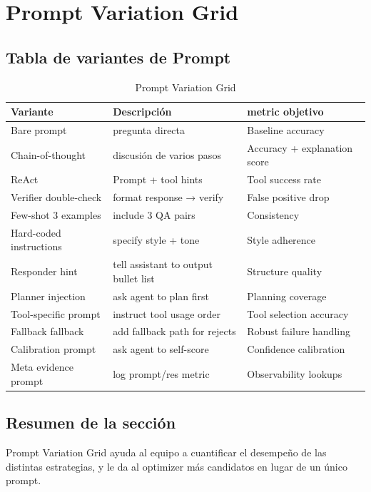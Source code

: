 \section{Prompt Variation Grid}

\subsection{Tabla de variantes de Prompt}

\begin{table}[H]
\centering
\caption{Prompt Variation Grid}
\begin{tabular}{p{}p{}p{}}
\toprule
Variante & Descripción & metric objetivo \\
\midrule
Bare prompt & pregunta directa & Baseline accuracy \\
Chain-of-thought & discusión de varios pasos & Accuracy + explanation score \\
ReAct & Prompt + tool hints & Tool success rate \\
Verifier double-check & format response → verify & False positive drop \\
Few-shot 3 examples & include 3 QA pairs & Consistency \\
Hard-coded instructions & specify style + tone & Style adherence \\
Responder hint & tell assistant to output bullet list & Structure quality \\
Planner injection & ask agent to plan first & Planning coverage \\
Tool-specific prompt & instruct tool usage order & Tool selection accuracy \\
Fallback fallback & add fallback path for rejects & Robust failure handling \\
Calibration prompt & ask agent to self-score & Confidence calibration \\
Meta evidence prompt & log prompt/res metric & Observability lookups \\
\bottomrule
\end{tabular}
\end{table}

\subsection{Resumen de la sección}

Prompt Variation Grid ayuda al equipo a cuantificar el desempeño de las distintas estrategias, y le da al optimizer más candidatos en lugar de un único prompt.

